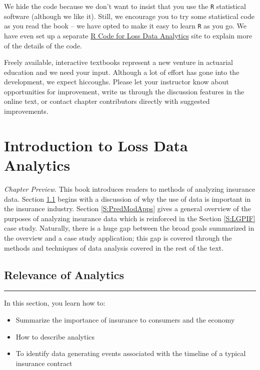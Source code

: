 \documentclass[]{book}
\providecommand{\tightlist}{%
  \setlength{\itemsep}{0pt}\setlength{\parskip}{0pt}}
\theoremstyle{definition}
\theoremstyle{definition}
\theoremstyle{definition}
\theoremstyle{remark}
\begin{document}
We hide the code because we don't want to insist that you use the
\texttt{R} statistical software (although we like it). Still, we
encourage you to try some statistical code as you read the book -- we
have opted to make it easy to learn \texttt{R} as you go. We have even
set up a separate \href{https://openacttexts.github.io/LDARcode}{R Code
for Loss Data Analytics} site to explain more of the details of the
code.

Freely available, interactive textbooks represent a new venture in
actuarial education and we need your input. Although a lot of effort has
gone into the development, we expect hiccoughs. Please let your
instructor know about opportunities for improvement, write us through
the discussion features in the online text, or contact chapter
contributors directly with suggested improvements.

\chapter{Introduction to Loss Data Analytics}\label{C:Intro}

\emph{Chapter Preview}. This book introduces readers to methods of
analyzing insurance data. Section \ref{S:Intro} begins with a discussion
of why the use of data is important in the insurance industry. Section
\ref{S:PredModApps} gives a general overview of the purposes of
analyzing insurance data which is reinforced in the Section
\ref{S:LGPIF} case study. Naturally, there is a huge gap between the
broad goals summarized in the overview and a case study application;
this gap is covered through the methods and techniques of data analysis
covered in the rest of the text.

\section{Relevance of Analytics}\label{S:Intro}

\begin{center}\rule{0.5\linewidth}{\linethickness}\end{center}

In this section, you learn how to:

\begin{itemize}
\tightlist
\item
  Summarize the importance of insurance to consumers and the economy
\item
  How to describe analytics
\item
  To identify data generating events associated with the timeline of a
  typical insurance contract
\end{itemize}
\end{document}
